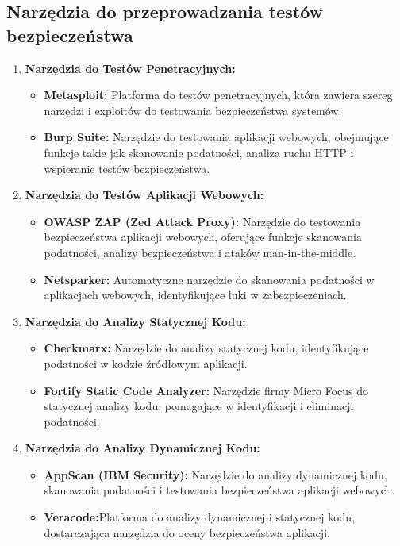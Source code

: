 \documentclass[12pt,twoside]{article}
\begin{document}
\subsection{Narzędzia do przeprowadzania testów bezpieczeństwa}
\begin{enumerate}
    \item \textbf{Narzędzia do Testów Penetracyjnych:}
    \begin{itemize}
        \item \textbf{Metasploit:} Platforma do testów penetracyjnych, która zawiera szereg narzędzi i exploitów do testowania bezpieczeństwa systemów.
        \item \textbf{Burp Suite:} Narzędzie do testowania aplikacji webowych, obejmujące funkcje takie jak skanowanie podatności, analiza ruchu HTTP i wspieranie testów bezpieczeństwa.
    \end{itemize}
    \item \textbf{Narzędzia do Testów Aplikacji Webowych:}
    \begin{itemize}
        \item \textbf{OWASP ZAP (Zed Attack Proxy): } Narzędzie do testowania bezpieczeństwa aplikacji webowych, oferujące funkcje skanowania podatności, analizy bezpieczeństwa i ataków man-in-the-middle.
        \item \textbf{Netsparker:} Automatyczne narzędzie do skanowania podatności w aplikacjach webowych, identyfikujące luki w zabezpieczeniach.
    \end{itemize}
    \item \textbf{Narzędzia do Analizy Statycznej Kodu:}
    \begin{itemize}
        \item \textbf{Checkmarx:} Narzędzie do analizy statycznej kodu, identyfikujące podatności w kodzie źródłowym aplikacji.
        \item \textbf{Fortify Static Code Analyzer: } Narzędzie firmy Micro Focus do statycznej analizy kodu, pomagające w identyfikacji i eliminacji podatności.
    \end{itemize}
    \item \textbf{Narzędzia do Analizy Dynamicznej Kodu:}
    \begin{itemize}
        \item \textbf{AppScan (IBM Security):} Narzędzie do analizy dynamicznej kodu, skanowania podatności i testowania bezpieczeństwa aplikacji webowych.
        \item \textbf{Veracode:}Platforma do analizy dynamicznej i statycznej kodu, dostarczająca narzędzia do oceny bezpieczeństwa aplikacji.

\end{itemize}
\end{enumerate}
\end{document}
